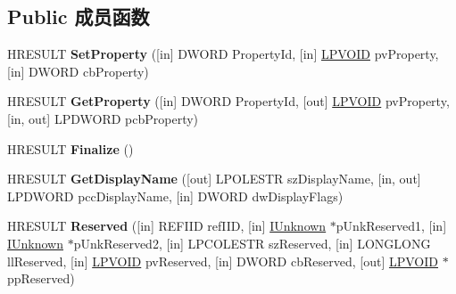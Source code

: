 \subsection*{Public 成员函数}
\begin{DoxyCompactItemize}
\item 
\mbox{\label{interface_i_assembly_name_aba559fd56851ee8b77259ba403c48b11}} 
H\+R\+E\+S\+U\+LT {\bfseries Set\+Property} (\mbox{[}in\mbox{]} D\+W\+O\+RD Property\+Id, \mbox{[}in\mbox{]} \hyperlink{interfacevoid}{L\+P\+V\+O\+ID} pv\+Property, \mbox{[}in\mbox{]} D\+W\+O\+RD cb\+Property)
\item 
\mbox{\label{interface_i_assembly_name_a71b3bd94e69eb4467fd460a23638e352}} 
H\+R\+E\+S\+U\+LT {\bfseries Get\+Property} (\mbox{[}in\mbox{]} D\+W\+O\+RD Property\+Id, \mbox{[}out\mbox{]} \hyperlink{interfacevoid}{L\+P\+V\+O\+ID} pv\+Property, \mbox{[}in, out\mbox{]} L\+P\+D\+W\+O\+RD pcb\+Property)
\item 
\mbox{\label{interface_i_assembly_name_a911e2877136614c9fd0afe77a714877a}} 
H\+R\+E\+S\+U\+LT {\bfseries Finalize} ()
\item 
\mbox{\label{interface_i_assembly_name_a3a4640545cd0a7d671386d8645d733e1}} 
H\+R\+E\+S\+U\+LT {\bfseries Get\+Display\+Name} (\mbox{[}out\mbox{]} L\+P\+O\+L\+E\+S\+TR sz\+Display\+Name, \mbox{[}in, out\mbox{]} L\+P\+D\+W\+O\+RD pcc\+Display\+Name, \mbox{[}in\mbox{]} D\+W\+O\+RD dw\+Display\+Flags)
\item 
\mbox{\label{interface_i_assembly_name_a391ee7d4b5adb41c0d3f97e2e2db9908}} 
H\+R\+E\+S\+U\+LT {\bfseries Reserved} (\mbox{[}in\mbox{]} R\+E\+F\+I\+ID ref\+I\+ID, \mbox{[}in\mbox{]} \hyperlink{interface_i_unknown}{I\+Unknown} $\ast$p\+Unk\+Reserved1, \mbox{[}in\mbox{]} \hyperlink{interface_i_unknown}{I\+Unknown} $\ast$p\+Unk\+Reserved2, \mbox{[}in\mbox{]} L\+P\+C\+O\+L\+E\+S\+TR sz\+Reserved, \mbox{[}in\mbox{]} L\+O\+N\+G\+L\+O\+NG ll\+Reserved, \mbox{[}in\mbox{]} \hyperlink{interfacevoid}{L\+P\+V\+O\+ID} pv\+Reserved, \mbox{[}in\mbox{]} D\+W\+O\+RD cb\+Reserved, \mbox{[}out\mbox{]} \hyperlink{interfacevoid}{L\+P\+V\+O\+ID} $\ast$pp\+Reserved)
\item 
\mbox{\label{interface_i_assembly_name_a0dd5593978995c731424ddb134ddf443}} 

\end{DoxyCompactItemize}
